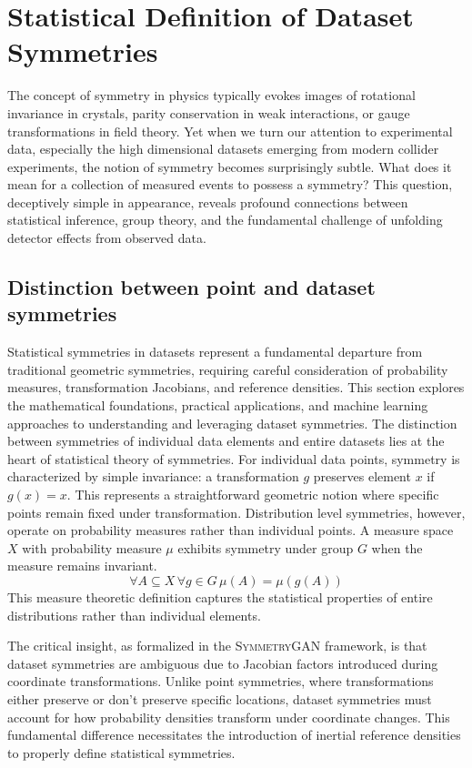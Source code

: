 \section{Statistical Definition of Dataset Symmetries}
    \label{sec:statistical-symmetries}
    The concept of symmetry in physics typically evokes images of rotational invariance in crystals, parity conservation in weak interactions, or gauge transformations in field theory.
    Yet when we turn our attention to experimental data, especially the high dimensional datasets emerging from modern collider experiments, the notion of symmetry becomes surprisingly subtle.
    What does it mean for a collection of measured events to possess a symmetry?
    This question, deceptively simple in appearance, reveals profound connections between statistical inference, group theory, and the fundamental challenge of unfolding detector effects from observed data.
    \subsection{Distinction between point and dataset symmetries}
        Statistical symmetries in datasets represent a fundamental departure from traditional geometric symmetries, requiring careful consideration of probability measures, transformation Jacobians, and reference densities.
        This section explores the mathematical foundations, practical applications, and machine learning approaches to understanding and leveraging dataset symmetries.
        The distinction between symmetries of individual data elements and entire datasets lies at the heart of statistical theory of symmetries.
        For individual data points, symmetry is characterized by simple invariance: a transformation \(g\) preserves element \(x\) if \(g(x) = x\). This represents a straightforward geometric notion where specific points remain fixed under transformation.
        Distribution level symmetries, however, operate on probability measures rather than individual points.
        A measure space \(X\) with probability measure \(\mu\) exhibits symmetry under group \(G\) when the measure remains invariant.\kd{}
        \[
            \forall A\subseteq X \, \forall g\in G\, \mu(A) = \mu(g(A))
        \]
        This measure theoretic definition captures the statistical properties of entire distributions rather than individual elements.
        
        The critical insight, as formalized in the \textsc{SymmetryGAN} framework, is that dataset symmetries are ambiguous due to Jacobian factors introduced during coordinate transformations.\kd{}
        Unlike point symmetries, where transformations either preserve or don't preserve specific locations, dataset symmetries must account for how probability densities transform under coordinate changes.
        This fundamental difference necessitates the introduction of inertial reference densities to properly define statistical symmetries.
